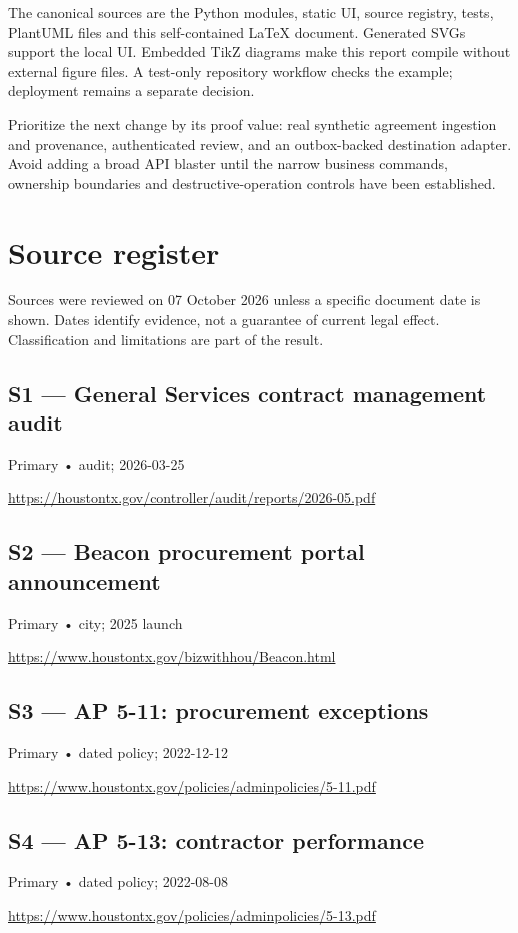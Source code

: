 \documentclass[11pt,letterpaper]{article}
\begin{document}
The canonical sources are the Python modules, static UI, source registry, tests, PlantUML files and this self-contained LaTeX document. Generated SVGs support the local UI. Embedded TikZ diagrams make this report compile without external figure files. A test-only repository workflow checks the example; deployment remains a separate decision.

Prioritize the next change by its proof value: real synthetic agreement ingestion and provenance, authenticated review, and an outbox-backed destination adapter. Avoid adding a broad API blaster until the narrow business commands, ownership boundaries and destructive-operation controls have been established.

\newpage\section{Source register}
Sources were reviewed on 07 October 2026 unless a specific document date is shown. Dates identify evidence, not a guarantee of current legal effect. Classification and limitations are part of the result.
\subsection*{S1 — General Services contract management audit}\label{src:S1}
Primary • audit; 2026-03-25\par
\url{https://houstontx.gov/controller/audit/reports/2026-05.pdf}

\subsection*{S2 — Beacon procurement portal announcement}\label{src:S2}
Primary • city; 2025 launch\par
\url{https://www.houstontx.gov/bizwithhou/Beacon.html}

\subsection*{S3 — AP 5-11: procurement exceptions}\label{src:S3}
Primary • dated policy; 2022-12-12\par
\url{https://www.houstontx.gov/policies/adminpolicies/5-11.pdf}

\subsection*{S4 — AP 5-13: contractor performance}\label{src:S4}
Primary • dated policy; 2022-08-08\par
\url{https://www.houstontx.gov/policies/adminpolicies/5-13.pdf}
\end{document}
